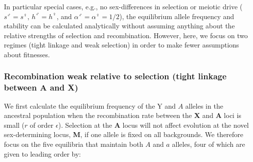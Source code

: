 \documentclass[12pt]{article}
\begin{document}
In particular special cases, e.g., no sex-differences in selection or meiotic drive ($s^\male=s^\female$, $h^\male=h^\female$, and $\alpha^\male=\alpha^\female=1/2$), the equilibrium allele frequency and stability can be calculated analytically without assuming anything about the relative strengths of selection and recombination. 
However, here, we focus on two regimes (tight linkage and weak selection) in order to make fewer assumptions about fitnesses. 

\subsubsection*{Recombination weak relative to selection (tight linkage between \textbf{A} and \textbf{X})}

We first calculate the equilibrium frequency of the Y and $A$ alleles in the ancestral population when the recombination rate between the \textbf{X} and \textbf{A} loci is small ($r$ of order $\epsilon$). 
Selection at the \textbf{A} locus will not affect evolution at the novel sex-determining locus, \textbf{M}, if one allele is fixed on all backgrounds. 
We therefore focus on the five equilibria that maintain both $A$ and $a$ alleles, four of which are given to leading order by:
\end{document}
